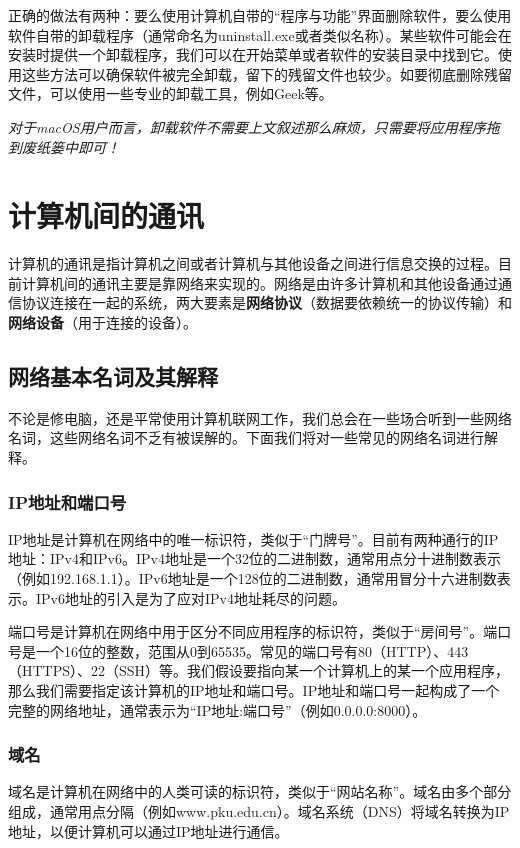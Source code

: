 \documentclass[../main.tex]{subfiles}
\begin{document}
正确的做法有两种：要么使用计算机自带的“程序与功能”界面删除软件，要么使用软件自带的卸载程序（通常命名为uninstall.exe或者类似名称）。某些软件可能会在安装时提供一个卸载程序，我们可以在开始菜单或者软件的安装目录中找到它。使用这些方法可以确保软件被完全卸载，留下的残留文件也较少。如要彻底删除残留文件，可以使用一些专业的卸载工具，例如Geek等。

\emph{对于macOS用户而言，卸载软件不需要上文叙述那么麻烦，只需要将应用程序拖到废纸篓中即可！}

\section{计算机间的通讯}

计算机的通讯是指计算机之间或者计算机与其他设备之间进行信息交换的过程。目前计算机间的通讯主要是靠网络来实现的。网络是由许多计算机和其他设备通过通信协议连接在一起的系统，两大要素是\textbf{网络协议}（数据要依赖统一的协议传输）和\textbf{网络设备}（用于连接的设备）。

\subsection{网络基本名词及其解释}

不论是修电脑，还是平常使用计算机联网工作，我们总会在一些场合听到一些网络名词，这些网络名词不乏有被误解的。下面我们将对一些常见的网络名词进行解释。

\subsubsection{IP地址和端口号}
IP地址是计算机在网络中的唯一标识符，类似于“门牌号”。目前有两种通行的IP地址：IPv4和IPv6。IPv4地址是一个32位的二进制数，通常用点分十进制数表示（例如192.168.1.1）。IPv6地址是一个128位的二进制数，通常用冒分十六进制数表示。IPv6地址的引入是为了应对IPv4地址耗尽的问题。

端口号是计算机在网络中用于区分不同应用程序的标识符，类似于“房间号”。端口号是一个16位的整数，范围从0到65535。常见的端口号有80（HTTP）、443（HTTPS）、22（SSH）等。我们假设要指向某一个计算机上的某一个应用程序，那么我们需要指定该计算机的IP地址和端口号。IP地址和端口号一起构成了一个完整的网络地址，通常表示为“IP地址:端口号”（例如0.0.0.0:8000）。

\subsubsection{域名}
域名是计算机在网络中的人类可读的标识符，类似于“网站名称”。域名由多个部分组成，通常用点分隔（例如www.pku.edu.cn）。域名系统（DNS）将域名转换为IP地址，以便计算机可以通过IP地址进行通信。
\end{document}
